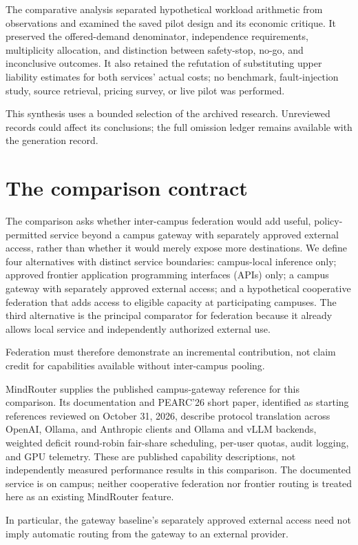 \documentclass[11pt]{article}
\begin{document}
The comparative analysis separated hypothetical workload arithmetic from observations and examined the saved pilot design and its economic critique. It preserved the offered-demand denominator, independence requirements, multiplicity allocation, and distinction between safety-stop, no-go, and inconclusive outcomes. It also retained the refutation of substituting upper liability estimates for both services' actual costs; no benchmark, fault-injection study, source retrieval, pricing survey, or live pilot was performed.

This synthesis uses a bounded selection of the archived research. Unreviewed records could affect its conclusions; the full omission ledger remains available with the generation record.
\section{The comparison contract}
The comparison asks whether inter-campus federation would add useful, policy-permitted service beyond a campus gateway with separately approved external access, rather than whether it would merely expose more destinations. We define four alternatives with distinct service boundaries: campus-local inference only; approved frontier application programming interfaces (APIs) only; a campus gateway with separately approved external access; and a hypothetical cooperative federation that adds access to eligible capacity at participating campuses. The third alternative is the principal comparator for federation because it already allows local service and independently authorized external use.

Federation must therefore demonstrate an incremental contribution, not claim credit for capabilities available without inter-campus pooling.

MindRouter supplies the published campus-gateway reference for this comparison. Its documentation and PEARC\textquoteright{}26 short paper, identified as starting references reviewed on October 31, 2026, describe protocol translation across OpenAI, Ollama, and Anthropic clients and Ollama and vLLM backends, weighted deficit round-robin fair-share scheduling, per-user quotas, audit logging, and GPU telemetry. These are published capability descriptions, not independently measured performance results in this comparison. The documented service is on campus; neither cooperative federation nor frontier routing is treated here as an existing MindRouter feature.

In particular, the gateway baseline\textquoteright{}s separately approved external access need not imply automatic routing from the gateway to an external provider.
\end{document}

